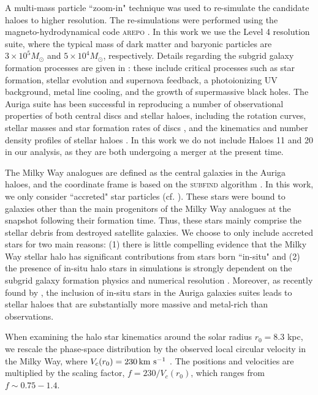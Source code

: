 \documentclass[fleqn,usenatbib]{mnras}
\newcommand{\kms}        {\,{\rm km}\,\,{\rm s}^{-1}}
\begin{document}
A multi-mass particle ``zoom-in" technique \citep{jenkins13} was used to re-simulate the candidate haloes to higher resolution. The re-simulations were performed using the magneto-hydrodynamical code \textsc{arepo} \citep{springel10}. In this work we use the Level 4 resolution suite, where the typical mass of dark matter and baryonic particles are $3 \times 10^5 M_\odot$ and $5 \times 10^4 M_\odot$, respectively. Details regarding the subgrid galaxy formation processes are given in \cite{grand17}: these include critical processes such as star formation, stellar evolution and supernova feedback, a photoionizing UV background, metal line cooling, and the growth of supermassive black holes. The Auriga suite has been successful in reproducing a number of observational properties of both central discs and stellar haloes, including the rotation curves, stellar masses and star formation rates of discs \citep[e.g.][]{grand17, marinacci17}, and the kinematics and number density profiles of stellar haloes \citep[e.g.][]{deason17, monachesi18}. In this work we do not include Haloes 11 and 20 in our analysis, as they are both undergoing a merger at the present time.

The Milky Way analogues are defined as the central galaxies in the Auriga haloes, and the coordinate frame is based on the \textsc{subfind} algorithm \citep{davis85}. In this work, we only consider ``accreted" star particles (cf. \citealt{fattahi19}). These stars were bound to galaxies other than the main progenitors of the Milky Way analogues at the snapshot following their formation time. Thus, these stars mainly comprise the stellar debris from destroyed satellite galaxies. We choose to only include accreted stars for two main reasons: (1) there is little compelling evidence that the Milky Way stellar halo has significant contributions from stars born ``in-situ" \citep[e.g.][]{deason17, belokurov18, dimatteo18, haywood18} and (2) the presence of in-situ halo stars in simulations is strongly dependent on the subgrid galaxy formation physics and numerical resolution \citep[e.g.][]{zolotov09, cooper15}. Moreover, as recently found by \cite{monachesi18}, the inclusion of in-situ stars in the Auriga galaxies suites leads to stellar haloes that are substantially more massive and metal-rich than observations.

When examining the halo star kinematics around the solar radius $r_0 =8.3$ kpc, we rescale the phase-space distribution by the observed local circular velocity in the Milky Way, where $V_c(r_0) = 230 \kms$ \citep{eilers18}. The positions and velocities are multiplied by the scaling factor, $f=230/V_c(r_0)$, which ranges from $f \sim 0.75-1.4$.
\end{document}
